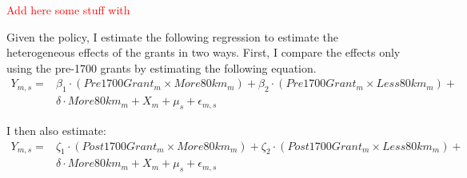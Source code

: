 \documentclass[11pt]{article}
\newcommand{\red}[1]{\textcolor{red}{#1}}
\begin{document}



\red{Add here some stuff with \textcite[p.~71]{Azevedo1944-gs}}


Given the policy, I estimate the following regression to estimate the heterogeneous effects of the grants in two ways. First, I compare the effects only using the pre-1700 grants by estimating the following equation.
\begin{equation}
  \label{eqn:livestock_1600}
  \begin{split}
  Y_{m,s} = & \beta_1 \cdot (Pre1700Grant_m  \times More80km_m) + \beta_2 \cdot (Pre1700Grant_m \times Less80km_m) + \\  
  & \delta \cdot  More80km_m + X_{m} + \mu_s + \epsilon_{m,s}
  \end{split}	
\end{equation}

I then also estimate:
\begin{equation}
  \label{eqn:livestock_1700}
  \begin{split}
  Y_{m,s} = & \zeta_1 \cdot (Post1700Grant_m  \times More80km_m) + \zeta_2 \cdot (Post1700Grant_m \times Less80km_m) + \\ 
  & \delta \cdot  More80km_m + X_{m} + \mu_s + \epsilon_{m,s}
  \end{split}
\end{equation}
\end{document}
